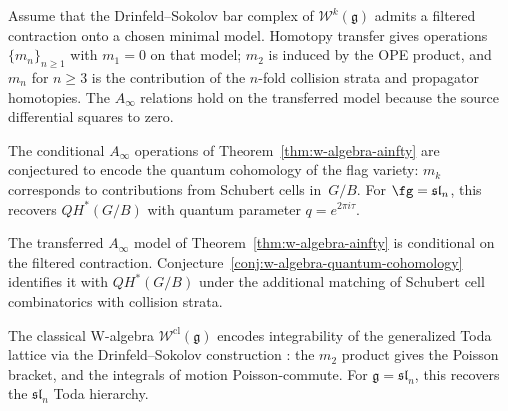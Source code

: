 \begin{theorem}
\label{thm:w-algebra-ainfty}
Assume that the Drinfeld--Sokolov bar complex of
$\mathcal{W}^k(\mathfrak g)$ admits a filtered contraction onto a
chosen minimal model. Homotopy transfer gives operations
$\{m_n\}_{n\ge1}$ with $m_1=0$ on that model; $m_2$ is induced by the
OPE product, and $m_n$ for $n\ge3$ is the contribution of the
$n$-fold collision strata and propagator homotopies. The
$A_\infty$ relations hold on the transferred model because the
source differential squares to zero.
\end{theorem}

\begin{conjecture}
\label{conj:w-algebra-quantum-cohomology}
\ClaimStatusConjectured
The conditional $A_\infty$ operations of
Theorem~\ref{thm:w-algebra-ainfty} are conjectured to encode the quantum
cohomology of the flag variety: $m_k$ corresponds to
contributions from Schubert cells in~$G/B$. For
$\fg = \mathfrak{sl}_n$, this recovers $QH^*(G/B)$
with quantum parameter $q = e^{2\pi i \tau}$.
\end{conjecture}

\begin{remark}
The transferred $A_\infty$ model of
Theorem~\ref{thm:w-algebra-ainfty} is conditional on the filtered
contraction. Conjecture~\ref{conj:w-algebra-quantum-cohomology}
identifies it with $QH^*(G/B)$ under the additional matching of
Schubert cell combinatorics with collision strata.
\end{remark}

\begin{theorem}\label{thm:w-classical-integrability}
The classical W-algebra $\mathcal{W}^{\mathrm{cl}}(\mathfrak{g})$ encodes integrability of the generalized Toda lattice via the Drinfeld--Sokolov construction \cite{DS}: the $m_2$ product gives the Poisson bracket, and the integrals of motion Poisson-commute.
For $\mathfrak{g} = \mathfrak{sl}_n$, this recovers the $\mathfrak{sl}_n$ Toda hierarchy.
\end{theorem}

